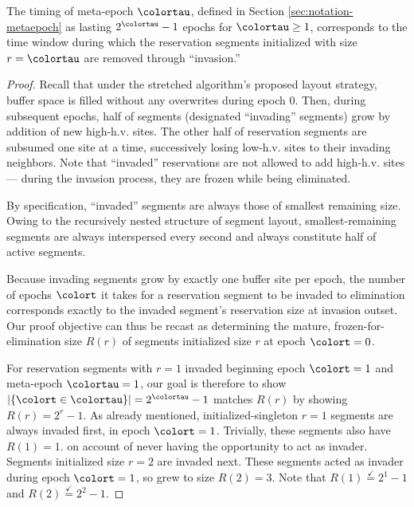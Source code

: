 \begin{lemma}
\label{thm:stretched-meta-epoch}

The timing of meta-epoch $\colortau$, defined in Section \ref{sec:notation-metaepoch} as lasting $2^{\colortau} - 1$ epochs for $\colortau\geq1$, corresponds to the time window during which the reservation segments initialized with size $r=\colortau$ are removed through ``invasion.''
\end{lemma}

\begin{proof}

Recall that under the stretched algorithm's proposed layout strategy, buffer space is filled without any overwrites during epoch 0.
Then, during subsequent epochs, half of segments (designated ``invading'' segments) grow by addition of new high-h.v. sites.
The other half of reservation segments are subsumed one site at a time, successively losing low-h.v. sites to their invading neighbors.
Note that ``invaded'' reservations are not allowed to add high-h.v. sites --- during the invasion process, they are frozen while being eliminated.

By specification, ``invaded'' segments are always those of smallest remaining size.
Owing to the recursively nested structure of segment layout, smallest-remaining segments are always interspersed every second and always constitute half of active segments.

Because invading segments grow by exactly one buffer site per epoch, the number of epochs $\colort$ it takes for a reservation segment to be invaded to elimination corresponds exactly to the invaded segment's reservation size at invasion outset.
Our proof objective can thus be recast as determining the mature, frozen-for-elimination size $R(r)$ of segments initialized size $r$ at epoch $\colort=0$.

For reservation segments with $r=1$ invaded beginning epoch $\colort=1$ and meta-epoch $\colortau = 1$, our goal is therefore to show $|\{\colort \in \colortau\}| = 2^{\colortau} - 1$ matches $R(r)$ by showing $R(r) = 2^{r} - 1$.
As already mentioned, initialized-singleton $r=1$ segments are always invaded first, in epoch $\colort=1$.
Trivially, these segments also have $R(1) = 1$. on account of never having the opportunity to act as invader.
Segments initialized size $r=2$ are invaded next.
These segments acted as invader during epoch $\colort=1$, so grew to size $R(2) = 3$.
Note that $R(1) \stackrel{\checkmark}{=} 2^1 - 1$ and $R(2) \stackrel{\checkmark}{=} 2^2 - 1$.


\end{proof}
